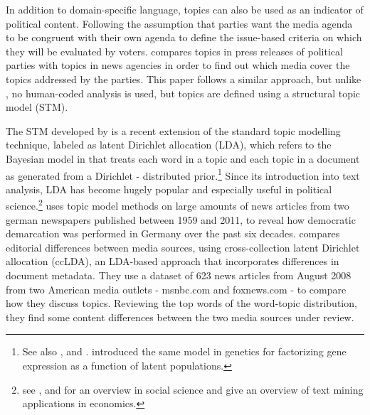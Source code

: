 \documentclass[12pt,a4paper,notitlepage]{article}
\begin{document}
In addition to domain-specific language, topics can also be used as an indicator of political content. Following the assumption that parties want the media agenda to be congruent with their own agenda to define the issue-based criteria on which they will be evaluated by voters. \citet{eberl_one_2017} compares topics in press releases of political parties with topics in news agencies in order to find out which media cover the topics addressed by the parties. This paper follows a similar approach, but unlike \citet{eberl_one_2017}, no human-coded analysis is used, but topics are defined using a structural topic model (STM).  

The STM developed by \citet{roberts_model_2016} is a recent extension of the standard topic modelling technique, labeled as latent Dirichlet allocation (LDA), which refers to the Bayesian model in \citet{blei_latent_2003} that treats each word in a topic and each topic in a document as generated from a Dirichlet - distributed prior.\footnote{See also \citet{griffiths_probabilistic_2002}, \citet{griffiths_finding_2004} and \citet{hofmann_probabilistic_1999}. \citet{pritchard_inference_2000} introduced the same model in genetics for factorizing gene expression as a function of latent populations.} Since its introduction into text analysis, LDA has become hugely popular and especially useful in political science.\footnote{see \citet{blei_probabilistic_2012}, \citet{grimmer_text_2013} and \citet{wiedmann_text_2016} for an overview in social science and \citet{gentzkow_text_2017} give an overview of text mining applications in economics.} \citet{wiedmann_text_2016} uses topic model methods on large amounts of news articles from two german newspapers published between 1959 and 2011, to reveal how democratic demarcation was performed in Germany over the past six decades. \citet{paul_cross-collection_2009} compares editorial differences between media sources, using cross-collection latent Dirichlet allocation (ccLDA), an LDA-based approach that incorporates differences in document metadata. They use a dataset of 623 news articles from August 2008 from two American media outlets - msnbc.com and foxnews.com - to compare how they discuss topics. Reviewing the top words of the word-topic distribution, they find some content differences between the two media sources under review.
\end{document}
